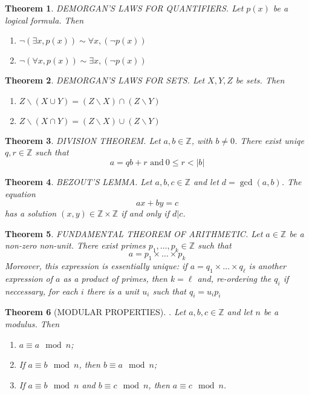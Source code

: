 \documentclass[12pt]{article}
\newtheorem{theorem}{Theorem}
\newcommand{\ba}{\backslash}
\DeclareMathOperator{\Gcd}{gcd}
\renewcommand{\gcd}[2]{\Gcd\left(#1, #2\right)}
\newcommand{\Z}{\mathbb{Z}}
\begin{document}
\begin{theorem}
DEMORGAN'S LAWS FOR QUANTIFIERS. Let $p(x)$ be a logical formula. Then
\begin{enumerate}
    \item $\neg(\exists x, p(x)) \sim \forall x, (\neg p(x))$ 
    \item $\neg(\forall x, p(x)) \sim \exists x, (\neg p(x))$
\end{enumerate}
\end{theorem}


\begin{theorem}
DEMORGAN'S LAWS FOR SETS. Let $X, Y, Z$ be sets. Then
\begin{enumerate}
    \item $Z\ba (X \cup Y) = (Z \ba X) \cap (Z \ba Y)$
    \item $Z\ba (X \cap Y) = (Z \ba X) \cup (Z \ba Y)$
\end{enumerate}
\end{theorem}


\begin{theorem}
DIVISION THEOREM. Let $a, b \in \Z$, with $b\neq 0$. There exist uniqe $q, r \in \Z$ such that 
$$ a = qb + r  \text{ and}\ 0 \leq r < |b|$$
\end{theorem}


\begin{theorem}
BEZOUT'S LEMMA. Let $a, b, c \in \Z$ and let $d = \gcd{a}{b}$. The equation 
$$ax + by = c$$
has a solution $(x,y) \in \Z \times \Z$ if and only if $d | c$.  
\end{theorem}


\begin{theorem}
FUNDAMENTAL THEOREM OF ARITHMETIC. Let $a \in \Z$ be a non-zero non-unit. There exist primes $p_1, \dots, p_k \in \Z$ such that 
$$a = p_1 \times \dots \times p_k$$
Moreover, this expression is essentially unique: if $a = q_1 \times \dots \times q_\ell$ is another expression of $a$ as a product of primes, then $k = \ell$ and, re-ordering the $q_i$ if neccessary, for each $i$ there is a unit $u_i$ such that $q_i = u_ip_i$
\end{theorem}


\begin{theorem}
[MODULAR PROPERTIES]. Let $a, b, c \in \Z$ and let $n$ be a modulus. Then
\begin{enumerate}
    \item $a \equiv a \mod{n}$;
    \item If $a \equiv b \mod{n}$, then $b \equiv a \mod{n}$;
    \item If $a \equiv b \mod{n}$ and $b \equiv c \mod{n}$, then $a \equiv c \mod{n}$.
\end{enumerate}
\end{theorem}
\end{document}
